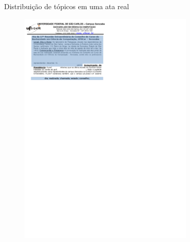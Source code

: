 \documentclass[xcolor=table]{beamer}
\begin{document}
\begin{frame}{Distribuição de tópicos em uma ata real} 
	\begin{figure}[h!]

		\includegraphics[trim={ 0 305 300 195 },clip,page=6,width=0.75\textwidth]{images/distribuicao-3-parts.pdf}

	\end{figure} 
\end{frame}
\end{document}
